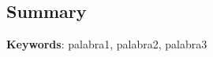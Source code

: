 \noindent \begin{center}
\section*{Summary}
\par\end{center}

\lipsum[1-2]

\vspace{0.5cm}
\begin{flushleft}
\textbf{Keywords}: palabra1, palabra2, palabra3
\end{flushleft}
